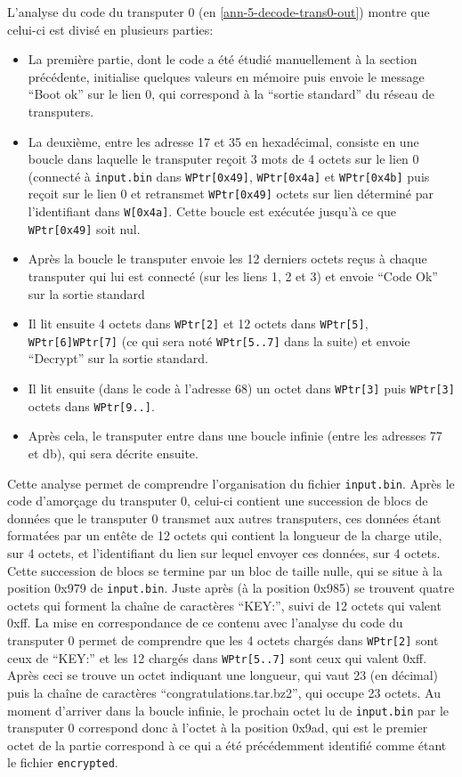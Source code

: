\documentclass[a4paper,10pt]{article}
\begin{document}
L'analyse du code du transputer 0 (en \ref{ann-5-decode-trans0-out}) montre que celui-ci est divisé en plusieurs parties:
\begin{itemize}
  \item La première partie, dont le code a été étudié manuellement à la section précédente, initialise quelques valeurs en mémoire puis envoie le message ``Boot ok'' sur le lien 0, qui correspond à la ``sortie standard'' du réseau de transputers.
  \item La deuxième, entre les adresse 17 et 35 en hexadécimal, consiste en une boucle dans laquelle le transputer reçoit 3 mots de 4 octets sur le lien 0 (connecté à \texttt{input.bin} dans \texttt{WPtr[0x49]}, \texttt{WPtr[0x4a]} et \texttt{WPtr[0x4b]} puis reçoit sur le lien 0 et retransmet \texttt{WPtr[0x49]} octets sur lien déterminé par l'identifiant dans \texttt{W[0x4a]}. Cette boucle est exécutée jusqu'à ce que \texttt{WPtr[0x49]} soit nul.
  \item Après la boucle le transputer envoie les 12 derniers octets reçus à chaque transputer qui lui est connecté (sur les liens 1, 2 et 3) et envoie ``Code Ok'' sur la sortie standard
  \item Il lit ensuite 4 octets dans \texttt{WPtr[2]} et 12 octets dans \texttt{WPtr[5]}, \texttt{WPtr[6]}\texttt{WPtr[7]} (ce qui sera noté \texttt{WPtr[5..7]} dans la suite) et envoie ``Decrypt'' sur la sortie standard.
  \item Il lit ensuite (dans le code à l'adresse 68) un octet dans \texttt{WPtr[3]} puis \texttt{WPtr[3]} octets dans \texttt{WPtr[9..]}.
  \item Après cela, le transputer entre dans une boucle infinie (entre les adresses 77 et db), qui sera décrite ensuite.
\end{itemize}

Cette analyse permet de comprendre l'organisation du fichier \texttt{input.bin}.
Après le code d'amorçage du transputer 0, celui-ci contient une succession de blocs de données que le transputer 0 transmet aux autres transputers, ces données étant formatées par un entête de 12 octets qui contient la longueur de la charge utile, sur 4 octets, et l'identifiant du lien sur lequel envoyer ces données, sur 4 octets.
Cette succession de blocs se termine par un bloc de taille nulle, qui se situe à la position 0x979 de \texttt{input.bin}.
Juste après (à la position 0x985) se trouvent quatre octets qui forment la chaîne de caractères ``KEY\string:'', suivi de 12 octets qui valent 0xff.
La mise en correspondance de ce contenu avec l'analyse du code du transputer 0 permet de comprendre que les 4 octets chargés dans \texttt{WPtr[2]} sont ceux de ``KEY\string:'' et les 12 chargés dans \texttt{WPtr[5..7]} sont ceux qui valent 0xff.
Après ceci se trouve un octet indiquant une longueur, qui vaut 23 (en décimal) puis la chaîne de caractères ``congratulations.tar.bz2'', qui occupe 23 octets.
Au moment d'arriver dans la boucle infinie, le prochain octet lu de \texttt{input.bin} par le transputer 0 correspond donc à l'octet à la position 0x9ad, qui est le premier octet de la partie correspond à ce qui a été précédemment identifié comme étant le fichier \texttt{encrypted}.
\end{document}
